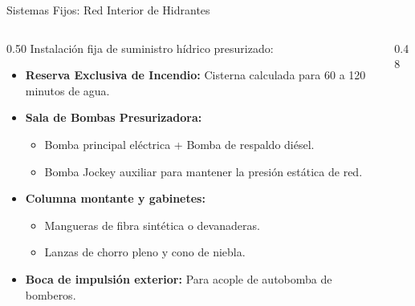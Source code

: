 \begin{frame}{Sistemas Fijos: Red Interior de Hidrantes}
  \begin{columns}[c]
    \begin{column}{0.50\textwidth}
      Instalación fija de suministro hídrico presurizado:
      \begin{itemize}
        \small
        \item \textbf{Reserva Exclusiva de Incendio:} Cisterna calculada para 60 a 120 minutos de agua.
        \item \textbf{Sala de Bombas Presurizadora:}
        \begin{itemize}
          \scriptsize
          \item Bomba principal eléctrica + Bomba de respaldo diésel.
          \item Bomba Jockey auxiliar para mantener la presión estática de red.
        \end{itemize}
        \item \textbf{Columna montante y gabinetes:}
        \begin{itemize}
          \scriptsize
          \item Mangueras de fibra sintética o devanaderas.
          \item Lanzas de chorro pleno y cono de niebla.
        \end{itemize}
        \item \textbf{Boca de impulsión exterior:} Para acople de autobomba de bomberos.
      \end{itemize}
    \end{column}

    \begin{column}{0.48\textwidth}
      \centering
\end{column}
\end{columns}
\end{frame}
